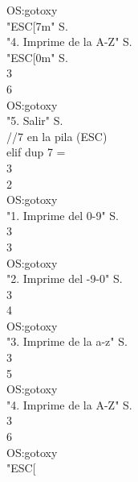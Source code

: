 \documentclass[conference]{IEEEtran}
\begin{document}
\begin{enumerate}
\begin{center}
OS:gotoxy \\ "ESC[7m" S. \\ "4. Imprime de la A-Z" S. \\ "ESC[0m" S. \\ 3 \\ 6 \\ OS:gotoxy \\ "5. Salir" S. \\ //7 en la pila (ESC) \\ elif dup 7 = \\ 3 \\ 2 \\ OS:gotoxy \\ "1. Imprime del 0-9" S. \\ 3 \\ 3 \\ OS:gotoxy \\ "2. Imprime del -9-0" S. \\ 3 \\ 4 \\ OS:gotoxy \\ "3. Imprime de la a-z" S. \\ 3 \\ 5 \\ OS:gotoxy \\ "4. Imprime de la A-Z" S. \\ 3 \\ 6 \\ OS:gotoxy \\ "ESC[
\end{center}
\end{enumerate}
\end{document}

